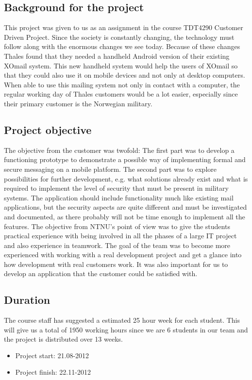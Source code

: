 \subsection{Background for the project}
This project was given to us as an assignment in the course TDT4290 Customer Driven Project. Since the society is constantly changing, the technology must follow along with the enormous changes we see today. Because of these changes Thales found that they needed a handheld Android version of their existing XOmail system. This new handheld system would help the users of XOmail so that they could also use it on mobile devices and not only at desktop computers. When able to use this mailing system not only in contact with a computer, the regular working day of Thales customers would be a lot easier, especially since their primary customer is the Norwegian military.

\subsection{Project objective}
The objective from the customer was twofold: The first part was to develop a functioning prototype to demonstrate a possible way of implementing formal and secure messaging on a mobile platform. The second part was to explore possibilities for further development, e.g. what solutions already exist and what is required to implement the level of security that must be present in military systems. The application should include functionality much like existing mail applications, but the security aspects are quite different and must be investigated and documented, as there probably will not be time enough to implement all the features.
\newline
\newline
The objective from NTNU’s point of view was to give the students practical experience with being involved in all the phases of a large IT project and also experience in teamwork. 
\newline
\newline
The goal of the team was to become more experienced with working with a real development project and get a glance into how development with real customers work. It was also important for us to develop an application that the customer could be satisfied with. 


\subsection{Duration}
The course staff has suggested a estimated 25 hour week for each student. This will give us a total of 1950 working hours since we are 6 students in our team and the project is distributed over 13 weeks.

\begin{itemize}
\item{}Project start: 21.08-2012
\item{}Project finish: 22.11-2012
\end{itemize}

